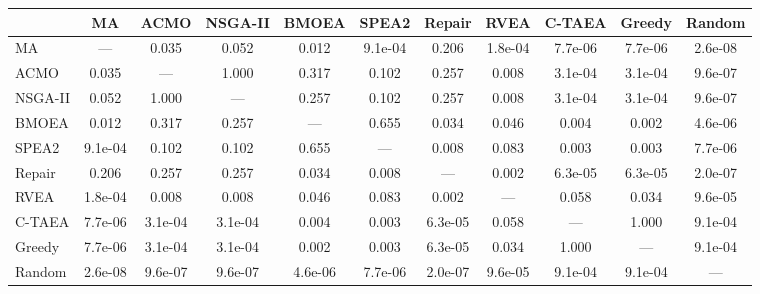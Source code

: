 \begin{tabular}{@{}lcccccccccc@{}}
\toprule
 & MA & ACMO & NSGA-II & BMOEA & SPEA2 & Repair & RVEA & C-TAEA & Greedy & Random \\
\midrule
MA & --- & 0.035 & 0.052 & 0.012 & 9.1e-04 & 0.206 & 1.8e-04 & 7.7e-06 & 7.7e-06 & 2.6e-08 \\
ACMO & 0.035 & --- & 1.000 & 0.317 & 0.102 & 0.257 & 0.008 & 3.1e-04 & 3.1e-04 & 9.6e-07 \\
NSGA-II & 0.052 & 1.000 & --- & 0.257 & 0.102 & 0.257 & 0.008 & 3.1e-04 & 3.1e-04 & 9.6e-07 \\
BMOEA & 0.012 & 0.317 & 0.257 & --- & 0.655 & 0.034 & 0.046 & 0.004 & 0.002 & 4.6e-06 \\
SPEA2 & 9.1e-04 & 0.102 & 0.102 & 0.655 & --- & 0.008 & 0.083 & 0.003 & 0.003 & 7.7e-06 \\
Repair & 0.206 & 0.257 & 0.257 & 0.034 & 0.008 & --- & 0.002 & 6.3e-05 & 6.3e-05 & 2.0e-07 \\
RVEA & 1.8e-04 & 0.008 & 0.008 & 0.046 & 0.083 & 0.002 & --- & 0.058 & 0.034 & 9.6e-05 \\
C-TAEA & 7.7e-06 & 3.1e-04 & 3.1e-04 & 0.004 & 0.003 & 6.3e-05 & 0.058 & --- & 1.000 & 9.1e-04 \\
Greedy & 7.7e-06 & 3.1e-04 & 3.1e-04 & 0.002 & 0.003 & 6.3e-05 & 0.034 & 1.000 & --- & 9.1e-04 \\
Random & 2.6e-08 & 9.6e-07 & 9.6e-07 & 4.6e-06 & 7.7e-06 & 2.0e-07 & 9.6e-05 & 9.1e-04 & 9.1e-04 & --- \\
\bottomrule
\end{tabular}